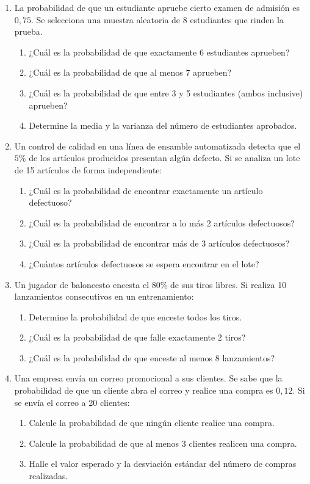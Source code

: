 \documentclass[letterpaper,12pt,spanish]{article}
\begin{document}
\begin{enumerate}[label=\arabic*.]
    \item La probabilidad de que un estudiante apruebe cierto examen de admisión es $0{,}75$. Se selecciona una muestra aleatoria de 8 estudiantes que rinden la prueba.
    \begin{enumerate}[label=\alph*)]
        \item ¿Cuál es la probabilidad de que exactamente 6 estudiantes aprueben?
        \item ¿Cuál es la probabilidad de que al menos 7 aprueben?
        \item ¿Cuál es la probabilidad de que entre 3 y 5 estudiantes (ambos inclusive) aprueben?
        \item Determine la media y la varianza del número de estudiantes aprobados.
    \end{enumerate}

    \item Un control de calidad en una línea de ensamble automatizada detecta que el $5\%$ de los artículos producidos presentan algún defecto. Si se analiza un lote de 15 artículos de forma independiente:
    \begin{enumerate}[label=\alph*)]
        \item ¿Cuál es la probabilidad de encontrar exactamente un artículo defectuoso?
        \item ¿Cuál es la probabilidad de encontrar a lo más 2 artículos defectuosos?
        \item ¿Cuál es la probabilidad de encontrar más de 3 artículos defectuosos?
        \item ¿Cuántos artículos defectuosos se espera encontrar en el lote?
    \end{enumerate}

    \item Un jugador de baloncesto encesta el $80\%$ de sus tiros libres. Si realiza 10 lanzamientos consecutivos en un entrenamiento:
    \begin{enumerate}[label=\alph*)]
        \item Determine la probabilidad de que enceste todos los tiros.
        \item ¿Cuál es la probabilidad de que falle exactamente 2 tiros?
        \item ¿Cuál es la probabilidad de que enceste al menos 8 lanzamientos?
    \end{enumerate}

    \item Una empresa envía un correo promocional a sus clientes. Se sabe que la probabilidad de que un cliente abra el correo y realice una compra es $0{,}12$. Si se envía el correo a 20 clientes:
    \begin{enumerate}[label=\alph*)]
        \item Calcule la probabilidad de que ningún cliente realice una compra.
        \item Calcule la probabilidad de que al menos 3 clientes realicen una compra.
        \item Halle el valor esperado y la desviación estándar del número de compras realizadas.
    \end{enumerate}


\end{enumerate}
\end{document}
